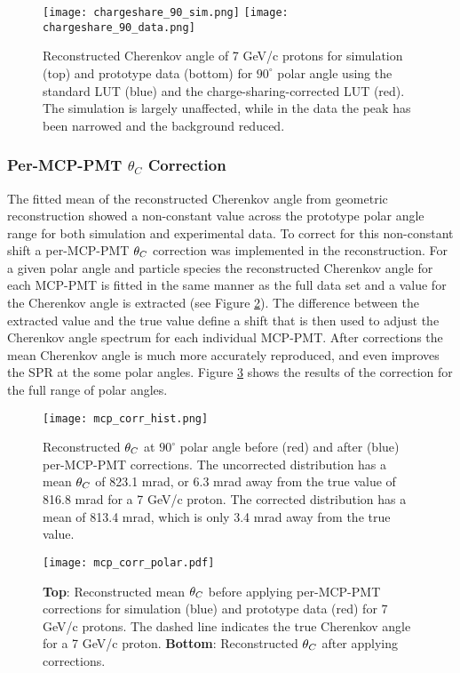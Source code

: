 \begin{figure}[!htb]
	\centering
	\texttt{[image: chargeshare\_90\_sim.png]}
	\texttt{[image: chargeshare\_90\_data.png]}
	\caption{Reconstructed Cherenkov angle of 7 GeV/c protons for simulation (top) and prototype data (bottom) for $90^\circ$ polar angle using the standard LUT (blue) and the charge-sharing-corrected LUT (red). The simulation is largely unaffected, while in the data the peak has been narrowed and the background reduced.}
	\label{fig:charge_sharing_reco}
\end{figure}


\subsubsection{Per-MCP-PMT $\theta_{C}$ Correction}
The fitted mean of the reconstructed Cherenkov angle from geometric reconstruction showed a non-constant value across the prototype polar angle range for both simulation and experimental data. To correct for this non-constant shift a per-MCP-PMT $\theta_{C}$ correction was implemented in the reconstruction. For a given polar angle and particle species the reconstructed Cherenkov angle for each MCP-PMT is fitted in the same manner as the full data set and a value for the Cherenkov angle is extracted (see Figure \ref{fig:mcp_corr_hist}). The difference between the extracted value and the true value define a shift that is then used to adjust the Cherenkov angle spectrum for each individual MCP-PMT. After corrections the mean Cherenkov angle is much more accurately reproduced, and even improves the SPR at the some polar angles. Figure \ref{fig:mcp_corr_polar} shows the results of the correction for the full range of polar angles.

\begin{figure}[!htb]
	\centering
	\texttt{[image: mcp\_corr\_hist.png]}
	\caption{Reconstructed $\theta_{C}$ at $90^\circ$ polar angle before (red) and after (blue) per-MCP-PMT corrections. The uncorrected distribution has a mean $\theta_{C}$ of 823.1 mrad, or 6.3 mrad away from the true value of 816.8 mrad for a 7 GeV/c proton. The corrected distribution has a mean of 813.4 mrad, which is only 3.4 mrad away from the true value.}
	\label{fig:mcp_corr_hist}
\end{figure}


\begin{figure}[!htb]
	\centering
	\texttt{[image: mcp\_corr\_polar.pdf]}
	\caption{\textbf{Top}: Reconstructed mean $\theta_{C}$ before applying per-MCP-PMT corrections for simulation (blue) and prototype data (red) for 7 GeV/c protons. The dashed line indicates the true Cherenkov angle for a 7 GeV/c proton. \textbf{Bottom}: Reconstructed $\theta_{C}$ after applying corrections.}
	\label{fig:mcp_corr_polar}
\end{figure}


